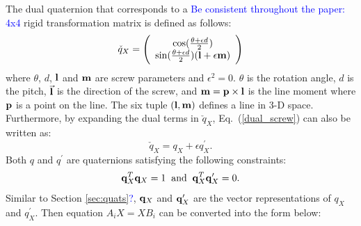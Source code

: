 \documentclass[twocolumn,10pt]{asme2ej}
\begin{document}
The dual quaternion that corresponds to a \textcolor{blue}{Be consistent throughout the paper: 4x4} %
rigid transformation matrix is defined as follows:
\begin{equation}
\check{q}_{X} =
\Bigg( 
\begin{array}{c}
\cos(\frac{\theta + \epsilon d}{2})\\
\sin(\frac{\theta + \epsilon d}{2})({\bf l} + \epsilon {\bf m})
\end{array}
\Bigg)
\label{dual_screw}
\end{equation}
where
$\theta$, $d$, ${\bf l}$ and ${\bf m}$ are screw parameters and ${\epsilon}^{2} = 0$. $\theta$ is the rotation angle, $d$ is the pitch, $\vec{\bf l}$ is the direction of the screw, and ${\bf m} = {\bf p} \times {\bf l}$ is the line moment where ${\bf p}$ is a point on the line. The six tuple $({\bf l}, {\bf m})$ defines a line in 3-D space. Furthermore, by expanding the dual terms in $\check{q}_{X}$, Eq.~(\ref{dual_screw}) can also be written as:
\begin{equation}
\check{q}_{X} = q_{X} + \epsilon {q}^{\prime}_{X}.
\end{equation} 
Both $q$ and $q^{\prime}$ are quaternions satisfying the following constraints:
\begin{equation}
{\bf q}^{T}_{X}{\bf q}_{X} = 1 \; \; \text{and} \;
\; {\bf q}^{T}_{X}{\bf q}^{\prime}_{X} = 0.
\end{equation}
Similar to Section \textcolor{blue}{\ref{sec:quats}?}, ${\bf q}_{X}$ and ${\bf q}^{\prime}_{X}$ are the vector representations of $q_{X}$ and $q^{\prime}_{X}$.
Then equation $A_{i}X = XB_{i}$ can be converted into the form below:
\end{document}
